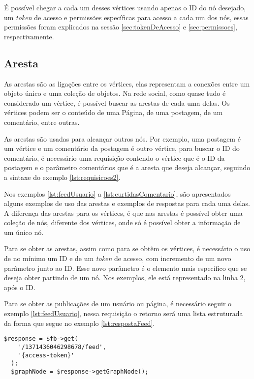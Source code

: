 É possível chegar a cada um desses vértices usando apenas o ID do nó desejado, um \textit{token} de acesso e permissões específicas para acesso a cada um dos nós, essas permissões foram explicados na sessão \ref{sec:tokenDeAcesso} e \ref{sec:permissoes}, respectivamente.

\subsection{Aresta}
As arestas são as ligações entre os vértices, elas representam a conexões entre um objeto único e uma coleção de objetos. Na rede social, como quase tudo é considerado um vértice, é possível buscar as arestas de cada uma delas. Os vértices podem ser o conteúdo de uma Página, de uma postagem, de um comentário, entre outras.

As arestas são usadas para alcançar outros nós. Por exemplo, uma postagem é um vértice e um comentário da postagem é outro vértice, para buscar o ID do comentário, é necessário uma requisição contendo o vértice que é o ID da postagem e o parâmetro comentários que é a aresta que deseja alcançar, seguindo a sintaxe do exemplo \ref{lst:requisicoes2}.

Nos exemplos \ref{lst:feedUsuario} a \ref{lst:curtidasComentario}, são apresentados alguns exemplos de uso das arestas e exemplos de respostas para cada uma delas. A diferença das arestas para os vértices, é que nas arestas é possível obter uma coleção de nós, diferente dos vértices, onde só é possível obter a informação de um único nó.

Para se obter as arestas, assim como para se obtêm os vértices, é necessário o uso de no mínimo um ID e de um \textit{token} de acesso, com incremento de um novo parâmetro junto ao ID. Esse novo parâmetro é o elemento mais específico que se deseja obter partindo de um nó. Nos exemplos, ele está representado na linha 2, após o ID.

Para se obter as publicações de um usuário ou página, é necessário seguir o exemplo \ref{lst:feedUsuario}, nessa requisição o retorno será uma lista estruturada da forma que segue no exemplo \ref{lst:respostaFeed}.

\begin{lstlisting}[caption={Requisitando todas as publicações de um usuário},label={lst:feedUsuario}]
  $response = $fb->get( 
    '/1371436046298678/feed', 
    '{access-token}'
  );
  $graphNode = $response->getGraphNode();
\end{lstlisting}

